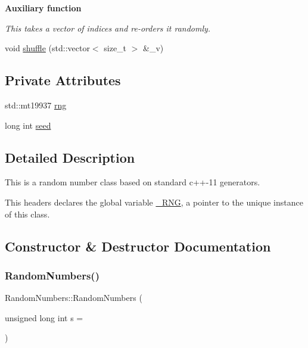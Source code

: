 \begin{Indent}\textbf{ Auxiliary function}\par
{\em This takes a vector of indices and re-\/orders it randomly. }\begin{DoxyCompactItemize}
\item 
void \hyperlink{classRandomNumbers_a851aaa7e46922dc22ce984b21b474a4e}{shuffle} (std\+::vector$<$ size\+\_\+t $>$ \&\+\_\+v)
\end{DoxyCompactItemize}
\end{Indent}
\subsection*{Private Attributes}
\begin{DoxyCompactItemize}
\item 
std\+::mt19937 \hyperlink{classRandomNumbers_a15ceee85d6d00de12ae76c90aaec2f14}{rng}
\item 
long int \hyperlink{classRandomNumbers_a83c563bc5ca60f2e5c149244b327d948}{seed}
\end{DoxyCompactItemize}


\subsection{Detailed Description}
This is a random number class based on standard c++-\/11 generators.

This headers declares the global variable \hyperlink{main_8cpp}{\+\_\+\+R\+NG}, a pointer to the unique instance of this class. 

\subsection{Constructor \& Destructor Documentation}
\mbox{\label{classRandomNumbers_aeceac66b253ad00f58e7b2252f18f609}} 
\subsubsection{\texorpdfstring{Random\+Numbers()}{RandomNumbers()}}
{\footnotesize\ttfamily Random\+Numbers\+::\+Random\+Numbers (\begin{DoxyParamCaption}\item[{unsigned long int}]{s = {} }\end{DoxyParamCaption})}



